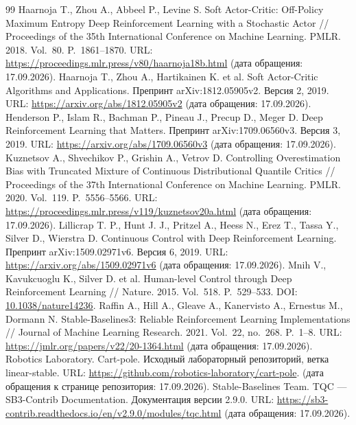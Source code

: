 \begin{thebibliography}{99}
 Haarnoja T., Zhou A., Abbeel P., Levine S. Soft Actor-Critic: Off-Policy Maximum Entropy Deep Reinforcement Learning with a Stochastic Actor // Proceedings of the 35th International Conference on Machine Learning. PMLR. 2018. Vol.~80. P.~1861–1870. URL: \url{https://proceedings.mlr.press/v80/haarnoja18b.html} (дата обращения: 17.09.2026).
 Haarnoja T., Zhou A., Hartikainen K. et al. Soft Actor-Critic Algorithms and Applications. Препринт arXiv:1812.05905v2. Версия 2, 2019. URL: \url{https://arxiv.org/abs/1812.05905v2} (дата обращения: 17.09.2026).
 Henderson P., Islam R., Bachman P., Pineau J., Precup D., Meger D. Deep Reinforcement Learning that Matters. Препринт arXiv:1709.06560v3. Версия 3, 2019. URL: \url{https://arxiv.org/abs/1709.06560v3} (дата обращения: 17.09.2026).
 Kuznetsov A., Shvechikov P., Grishin A., Vetrov D. Controlling Overestimation Bias with Truncated Mixture of Continuous Distributional Quantile Critics // Proceedings of the 37th International Conference on Machine Learning. PMLR. 2020. Vol.~119. P.~5556–5566. URL: \url{https://proceedings.mlr.press/v119/kuznetsov20a.html} (дата обращения: 17.09.2026).
 Lillicrap T. P., Hunt J. J., Pritzel A., Heess N., Erez T., Tassa Y., Silver D., Wierstra D. Continuous Control with Deep Reinforcement Learning. Препринт arXiv:1509.02971v6. Версия 6, 2019. URL: \url{https://arxiv.org/abs/1509.02971v6} (дата обращения: 17.09.2026).
 Mnih V., Kavukcuoglu K., Silver D. et al. Human-level Control through Deep Reinforcement Learning // Nature. 2015. Vol.~518. P.~529–533. DOI: \href{https://doi.org/10.1038/nature14236}{10.1038/nature14236}.
 Raffin A., Hill A., Gleave A., Kanervisto A., Ernestus M., Dormann N. Stable-Baselines3: Reliable Reinforcement Learning Implementations // Journal of Machine Learning Research. 2021. Vol.~22, no.~268. P.~1–8. URL: \url{https://jmlr.org/papers/v22/20-1364.html} (дата обращения: 17.09.2026).
 Robotics Laboratory. Cart-pole. Исходный лабораторный репозиторий, ветка linear-stable. URL: \url{https://github.com/robotics-laboratory/cart-pole}. (дата обращения к странице репозитория: 17.09.2026).
 Stable-Baselines Team. TQC — SB3-Contrib Documentation. Документация версии 2.9.0. URL: \url{https://sb3-contrib.readthedocs.io/en/v2.9.0/modules/tqc.html} (дата обращения: 17.09.2026).

\end{thebibliography}
